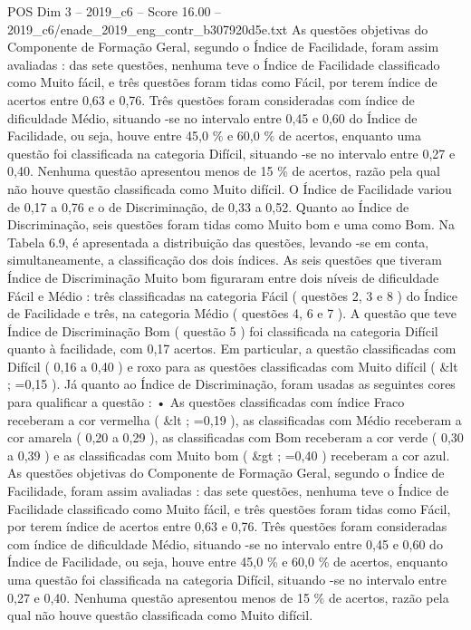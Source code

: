 \begin{textsample}{POS Dim 3 – 2019\_c6 – Score 16.00 – 2019\_c6/enade\_2019\_eng\_contr\_b307920d5e.txt}
As questões objetivas do Componente de Formação Geral, segundo o Índice de Facilidade, foram assim avaliadas : das sete questões, nenhuma teve o Índice de Facilidade classificado como Muito fácil, e três questões foram tidas como Fácil, por terem índice de acertos entre 0,63 e 0,76.
Três questões foram consideradas com índice de dificuldade Médio, situando -se no intervalo entre 0,45 e 0,60 do Índice de Facilidade, ou seja, houve entre 45,0 \% e 60,0 \% de acertos, enquanto uma questão foi classificada na categoria Difícil, situando -se no intervalo entre 0,27 e 0,40.
Nenhuma questão apresentou menos de 15 \% de acertos, razão pela qual não houve questão classificada como Muito difícil.
O Índice de Facilidade variou de 0,17 a 0,76 e o de Discriminação, de 0,33 a 0,52.
Quanto ao Índice de Discriminação, seis questões foram tidas como Muito bom e uma como Bom.
Na Tabela 6.9, é apresentada a distribuição das questões, levando -se em conta, simultaneamente, a classificação dos dois índices.
As seis questões que tiveram Índice de Discriminação Muito bom figuraram entre dois níveis de dificuldade Fácil e Médio : três classificadas na categoria Fácil ( questões 2, 3 e 8 ) do Índice de Facilidade e três, na categoria Médio ( questões 4, 6 e 7 ).
A questão que teve Índice de Discriminação Bom ( questão 5 ) foi classificada na categoria Difícil quanto à facilidade, com 0,17 acertos.
Em particular, a questão classificadas com Difícil ( 0,16 a 0,40 ) e roxo para as questões classificadas com Muito difícil ( \&lt ; =0,15 ).
Já quanto ao Índice de Discriminação, foram usadas as seguintes cores para qualificar a questão : • As questões classificadas com índice Fraco receberam a cor vermelha ( \&lt ; =0,19 ), as classificadas com Médio receberam a cor amarela ( 0,20 a 0,29 ), as classificadas com Bom receberam a cor verde ( 0,30 a 0,39 ) e as classificadas com Muito bom ( \&gt ; =0,40 ) receberam a cor azul.
As questões objetivas do Componente de Formação Geral, segundo o Índice de Facilidade, foram assim avaliadas : das sete questões, nenhuma teve o Índice de Facilidade classificado como Muito fácil, e três questões foram tidas como Fácil, por terem índice de acertos entre 0,63 e 0,76.
Três questões foram consideradas com índice de dificuldade Médio, situando -se no intervalo entre 0,45 e 0,60 do Índice de Facilidade, ou seja, houve entre 45,0 \% e 60,0 \% de acertos, enquanto uma questão foi classificada na categoria Difícil, situando -se no intervalo entre 0,27 e 0,40.
Nenhuma questão apresentou menos de 15 \% de acertos, razão pela qual não houve questão classificada como Muito difícil.

\end{textsample}
